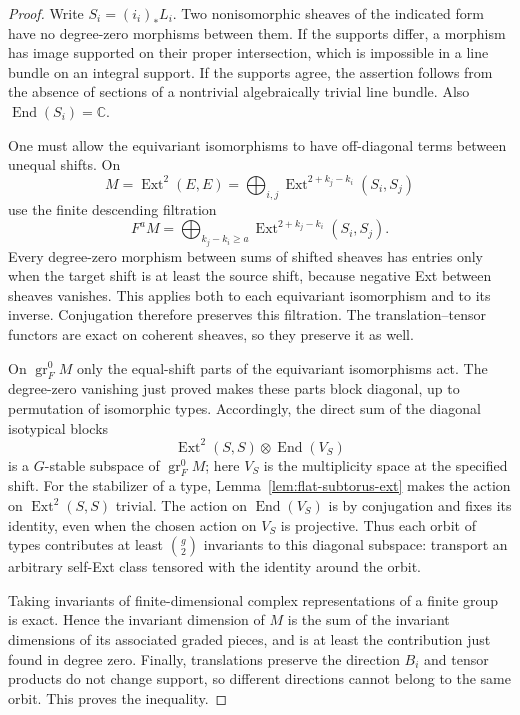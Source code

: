 \documentclass[11pt]{article}
\theoremstyle{definition}
\theoremstyle{remark}
\begin{document}
\begin{proof}
Write $S_i=(i_i)_*L_i$.  Two nonisomorphic sheaves of the indicated
form have no degree-zero morphisms between them.  If the supports
differ, a morphism has image supported on their proper intersection,
which is impossible in a line bundle on an integral support.  If
the supports agree, the assertion follows from the absence of
sections of a nontrivial algebraically trivial line bundle.
Also $\operatorname{End}(S_i)=\mathbb C$.

One must allow the equivariant isomorphisms to have off-diagonal
terms between unequal shifts.  On
\[
 M=\operatorname{Ext}^2(E,E)
   =\bigoplus_{i,j}\operatorname{Ext}^{2+k_j-k_i}(S_i,S_j)
\]
use the finite descending filtration
\[
 F^aM=\bigoplus_{k_j-k_i\geq a}
             \operatorname{Ext}^{2+k_j-k_i}(S_i,S_j).
\]
Every degree-zero morphism between sums of shifted sheaves has
entries only when the target shift is at least the source shift,
because negative Ext between sheaves vanishes.  This applies both
to each equivariant isomorphism and to its inverse.  Conjugation
therefore preserves this filtration.  The translation--tensor
functors are exact on coherent sheaves, so they preserve it as
well.

On $\operatorname{gr}^0_F M$ only the equal-shift parts of the
equivariant isomorphisms act.  The degree-zero vanishing just proved
makes these parts block diagonal, up to permutation of isomorphic
types.  Accordingly, the direct sum of the diagonal isotypical
blocks
\[
 \operatorname{Ext}^2(S,S)\otimes\operatorname{End}(V_S)
\]
is a $G$-stable subspace of $\operatorname{gr}^0_F M$; here $V_S$
is the multiplicity space at the specified shift.
For the stabilizer of a type, Lemma~\ref{lem:flat-subtorus-ext}
makes the action on $\operatorname{Ext}^2(S,S)$ trivial.  The
action on $\operatorname{End}(V_S)$ is by conjugation and fixes
its identity, even when the chosen action on $V_S$ is projective.
Thus each orbit of types contributes at least $\binom g2$
invariants to this diagonal subspace: transport an arbitrary
self-Ext class tensored with the identity around the orbit.

Taking invariants of finite-dimensional complex representations
of a finite group is exact.  Hence the invariant dimension of
$M$ is the sum of the invariant dimensions of its associated
graded pieces, and is at least the contribution just found in
degree zero.  Finally, translations preserve the direction $B_i$
and tensor products do not change support, so different directions
cannot belong to the same orbit.  This proves the inequality.
\end{proof}
\end{document}
